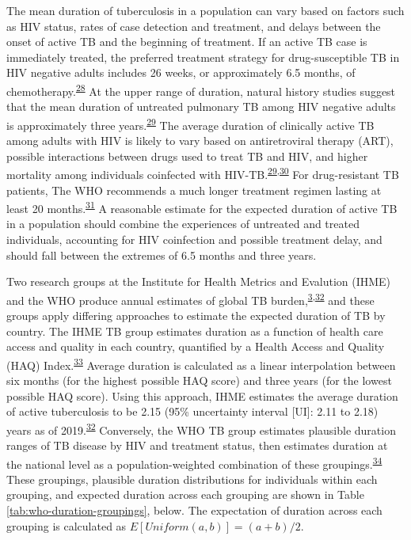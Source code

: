 \documentclass[
]{article}
\begin{document}
The mean duration of tuberculosis in a population can vary based on factors such as HIV status, rates of case detection and treatment, and delays between the onset of active TB and the beginning of treatment. If an active TB case is immediately treated, the preferred treatment strategy for drug-susceptible TB in HIV negative adults includes 26 weeks, or approximately 6.5 months, of chemotherapy.\textsuperscript{\protect\hyperlink{ref-Nahid2016}{28}} At the upper range of duration, natural history studies suggest that the mean duration of untreated pulmonary TB among HIV negative adults is approximately three years.\textsuperscript{\protect\hyperlink{ref-Tiemersma2011}{29}} The average duration of clinically active TB among adults with HIV is likely to vary based on antiretroviral therapy (ART), possible interactions between drugs used to treat TB and HIV, and higher mortality among individuals coinfected with HIV-TB.\textsuperscript{\protect\hyperlink{ref-Tiemersma2011}{29},\protect\hyperlink{ref-Payne2007}{30}} For drug-resistant TB patients, The WHO recommends a much longer treatment regimen lasting at least 20 months.\textsuperscript{\protect\hyperlink{ref-Falzon2011}{31}} A reasonable estimate for the expected duration of active TB in a population should combine the experiences of untreated and treated individuals, accounting for HIV coinfection and possible treatment delay, and should fall between the extremes of 6.5 months and three years.

Two research groups at the Institute for Health Metrics and Evalution (IHME) and the WHO produce annual estimates of global TB burden,\textsuperscript{\protect\hyperlink{ref-WorldHealthOrganization2020a}{3},\protect\hyperlink{ref-Ledesma2021}{32}} and these groups apply differing approaches to estimate the expected duration of TB by country. The IHME TB group estimates duration as a function of health care access and quality in each country, quantified by a Health Access and Quality (HAQ) Index.\textsuperscript{\protect\hyperlink{ref-Fullman2018}{33}} Average duration is calculated as a linear interpolation between six months (for the highest possible HAQ score) and three years (for the lowest possible HAQ score). Using this approach, IHME estimates the average duration of active tuberculosis to be 2.15 (95\% uncertainty interval {[}UI{]}: 2.11 to 2.18) years as of 2019.\textsuperscript{\protect\hyperlink{ref-Ledesma2021}{32}} Conversely, the WHO TB group estimates plausible duration ranges of TB disease by HIV and treatment status, then estimates duration at the national level as a population-weighted combination of these groupings.\textsuperscript{\protect\hyperlink{ref-Glaziou2020}{34}} These groupings, plausible duration distributions for individuals within each grouping, and expected duration across each grouping are shown in Table \ref{tab:who-duration-groupings}, below. The expectation of duration across each grouping is calculated as \(E[Uniform(a, b)] = (a+b)/2\).
\end{document}
